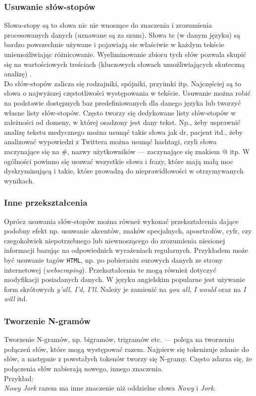 \subsubsection{Usuwanie słów-stopów}
Słowa-stopy są to słowa nic nie wnoszące do znaczenia i zrozumienia procesowanych danych (uznawane są za szum). Słowa te (w danym języku) są bardzo powszechnie używane i pojawiają sie właściwie w każdym tekście uniemożliwiając różnicowanie. Wyeliminowanie zbioru tych słów pozwala skupić się na wartościowych treściach (kluczowych słowach umożliwiających skuteczną analizę) \cite{stopwords}. \\
Do słów-stopów zalicza się rodzajniki, spójniki, przyimki itp. Najczęściej są to słowa o najwyższej częstotliwości występowania w tekście. Usuwanie można robić na podstawie dostępnych baz predefiniowanych dla danego języka lub tworzyć własne listy słów-stopów.
Często tworzy się dedykowane listy słów-stopów w zależności od domeny, w której osadzony jest dany tekst. Np., żeby usprawnić analizę tekstu medycznego można usunąć takie słowa jak dr, pacjent itd., żeby analizować wypowiedzi z Twittera można usunąć hashtagi, czyli słowa zaczynające się na \#, nazwy użytkowników --- zaczynające się znakiem @ itp. W ogólności powinno się usuwać wszystkie słowa i frazy, które mają małą moc dyskryminującą i takie, które prowadzą do nieprawidłowości w otrzymywanych wynikach.


\subsubsection{Inne przekształcenia}
Oprócz usuwania słów-stopów można równeż wykonać przekształcenia dające podobny efekt np.
usuwanie akcentów, znaków specjalnych, aposrtrofów, cyfr, czy czegokolwiek niepotrzebnego lub niewnoszącego do zrozumienia niesionej informacji bazując na odpowiednich wyrażeniach regularnych. Przykładem może być usuwanie tagów \verb|HTML|, np. po pobieraniu surowych danych ze strony internetowej (\textit{webscraping}). Przekształcenia te mogą również dotyczyć modyfikacji posiadanych danych. W języku angielskim popularne jest używanie form skrótowych \textit{y'all, I'd, I'll}. Należy je zamienić na \textit{you all}, \textit{I would} oraz na \textit{I will} itd.


\subsubsection{Tworzenie N-gramów}
Tworzenie N-gramów, np. bigramów, trigramów etc. --- polega na tworzeniu połączeń słów, które mogą występować razem. Najpierw się tokenizuje zdanie do słów, a następnie z powstałych tokenów tworzy się N-gramy.
Często zdarza się, że połączenia słów nabierają nowego, innego znaczenia. \\
Przykład: \\
\textit{Nowy Jork} razem ma inne znaczenie niż oddzielne słowa \textit{Nowy} i \textit{Jork}.


